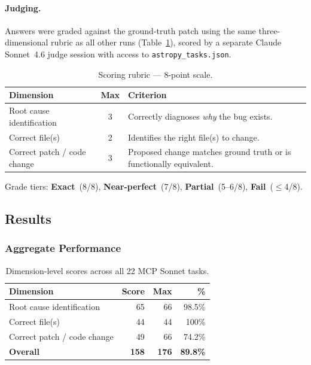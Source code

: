 \paragraph{Judging.}
Answers were graded against the ground-truth patch using the same
three-dimensional rubric as all other runs (Table~\ref{tab:rubric-mcp-sonnet}),
scored by a separate Claude Sonnet~4.6 judge session with access to
\texttt{astropy\_tasks.json}.

\begin{table}[h]
\centering
\caption{Scoring rubric --- 8-point scale.}\label{tab:rubric-mcp-sonnet}
\begin{tabular}{lcp{8cm}}
\toprule
\textbf{Dimension} & \textbf{Max} & \textbf{Criterion} \\
\midrule
Root cause identification   & 3 & Correctly diagnoses \emph{why} the bug exists. \\
Correct file(s)             & 2 & Identifies the right file(s) to change. \\
Correct patch / code change & 3 & Proposed change matches ground truth or is functionally equivalent. \\
\bottomrule
\end{tabular}
\end{table}

\noindent
Grade tiers: \textbf{Exact}~(8/8), \textbf{Near-perfect}~(7/8),
\textbf{Partial}~(5--6/8), \textbf{Fail}~($\le$4/8).

\subsection{Results}

\subsubsection{Aggregate Performance}

\begin{table}[h]
\centering
\caption{Dimension-level scores across all 22 MCP Sonnet tasks.}\label{tab:dim-mcp-sonnet}
\begin{tabular}{lrrr}
\toprule
\textbf{Dimension} & \textbf{Score} & \textbf{Max} & \textbf{\%} \\
\midrule
Root cause identification   & 65 & 66 & 98.5\% \\
Correct file(s)             & 44 & 44 & 100\%  \\
Correct patch / code change & 49 & 66 & 74.2\% \\
\midrule
\textbf{Overall}            & \textbf{158} & \textbf{176} & \textbf{89.8\%} \\
\bottomrule
\end{tabular}
\end{table}

